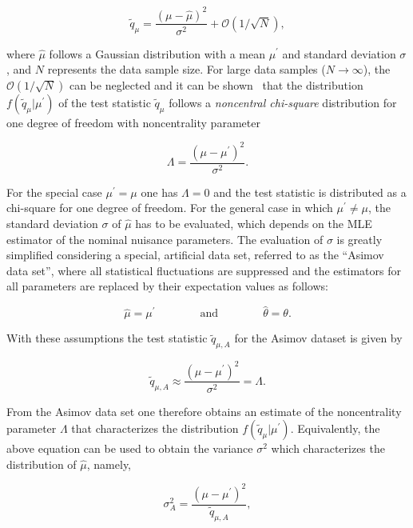 \begin{equation}
\tilde{q}_\mu = \frac{(\mu-\hat{\mu})^2}{\sigma^2} + \mathcal{O}(1/\sqrt{N}),
\end{equation}

\noindent where $\hat{\mu}$ follows a Gaussian distribution with a mean $\mu^\prime$ and standard deviation $\sigma$, and $N$ represents the data sample size.
For large data samples ($N\rightarrow\infty$), the $\mathcal{O}(1/\sqrt{N})$ can be neglected and it can be shown~\cite{wilks1938} that the distribution $f(\tilde{q}_\mu|\mu^\prime)$ of the test statistic $\tilde{q}_\mu$
follows a \textit{noncentral chi-square} distribution for one degree of freedom with noncentrality parameter

\begin{equation}
\Lambda = \frac{(\mu-\mu^\prime)^2}{\sigma^2}.
\end{equation}

For the special case $\mu^\prime = \mu$ one has $\Lambda = 0$ and the test statistic is distributed as a chi-square for one degree of freedom.
For the general case in which $\mu^\prime \neq \mu$, the standard deviation $\sigma$ of $\hat{\mu}$ has to be evaluated, which depends on the MLE estimator of the nominal nuisance parameters.
The evaluation of $\sigma$ is greatly simplified considering a special, artificial data set, referred to as the ``Asimov data set'', where all statistical fluctuations are suppressed and the estimators for all parameters
are replaced by their expectation values as follows:

\begin{equation}
\hat{\mu} = \mu^\prime \qquad\qquad \mathrm{and} \qquad\qquad \hat{\theta} = \theta.
\end{equation}

With these assumptions the test statistic $\tilde{q}_{\mu,A}$ for the Asimov dataset is given by 

\begin{equation}
\tilde{q}_{\mu,A} \approx \frac{(\mu-\mu^\prime)^2}{\sigma^2} = \Lambda.
\end{equation}

From the Asimov data set one therefore obtains an estimate of the noncentrality parameter $\Lambda$ that characterizes the distribution $f(\tilde{q}_\mu|\mu^\prime)$.
Equivalently, the above equation can be used to obtain the variance $\sigma^2$ which characterizes the distribution of $\hat{\mu}$, namely,

\begin{equation}
\sigma_A^2 = \frac{(\mu-\mu^\prime)^2}{\tilde{q}_{\mu,A}},
\end{equation}

